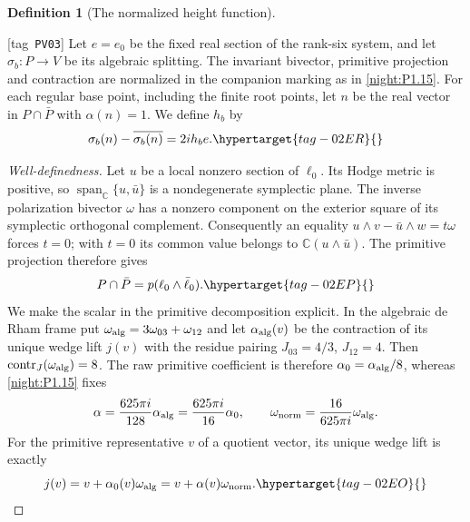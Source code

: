 \documentclass[11pt,a4paper]{article}
\numberwithin{equation}{section}
\theoremstyle{definition}
\newtheorem{definition}[definition]{Definition}
\newcommand{\StatementRecord}[4]{{\upshape\footnotesize[tag~\texttt{#3}]}\enspace\ignorespaces}
\begin{document}
\begin{definition}[The normalized height function]
\hypertarget{tag-PV03}{}\label{def:hb}
\StatementRecord{def:hb}{proved}{PV03}{}
Let $e=e_0$ be the fixed real section of the rank-six system,
and let $\sigma_b:P\to V$ be its algebraic splitting.
The invariant bivector, primitive projection and contraction are
normalized in the companion marking as in \cref{night:P1.15}.
For each regular base point, including the finite root points,
let $n$ be the real vector in $P\cap\bar P$ with $\alpha(n)=1$.
We define $h_b$ by
\begin{equation}
 \sigma_b(n)-\overline{\sigma_b(n)}=2i h_b e.
 \hypertarget{tag-02ER}{}\label{maps:eq:F.20}
\end{equation}
\end{definition}
\begin{proof}[Well-definedness]
Let $u$ be a local nonzero section of $\ell_0$.
Its Hodge metric is positive, so $\operatorname{span}_{\mathbb C}\{u,\bar u\}$
is a nondegenerate symplectic plane. The inverse polarization
bivector $\omega$ has a nonzero component on the exterior square
of its symplectic orthogonal complement. Consequently an equality
$u\wedge v-\bar u\wedge w=t\omega$ forces $t=0$; with $t=0$
its common value belongs to $\mathbb C(u\wedge\bar u)$.
The primitive projection therefore gives
\begin{equation}
 P\cap\bar P=p(\ell_0\wedge\bar\ell_0).
 \hypertarget{tag-02EP}{}\label{maps:eq:F.19}
\end{equation}
We make the scalar in the primitive decomposition explicit.
In the algebraic de Rham frame put
$\omega_{\rm alg}=3\omega_{03}+\omega_{12}$ and let
$\alpha_{\rm alg}(v)$ be the contraction of its unique wedge
lift $j(v)$ with the residue pairing $J_{03}=4/3$, $J_{12}=4$. Then
$\operatorname{contr}_{J}(\omega_{\rm alg})=8$. The raw primitive
coefficient is therefore $\alpha_0=\alpha_{\rm alg}/8$, whereas
\cref{night:P1.15} fixes
\[
 \alpha=\frac{625\pi i}{128}\alpha_{\rm alg}
        =\frac{625\pi i}{16}\alpha_0,
 \qquad
 \omega_{\rm norm}=\frac{16}{625\pi i}\omega_{\rm alg}.
\]
For the primitive representative $v$ of a quotient vector, its
unique wedge lift is exactly
\begin{equation}
 j(v)=v+\alpha_0(v)\omega_{\rm alg}
     =v+\alpha(v)\omega_{\rm norm}.
 \hypertarget{tag-02EO}{}\label{maps:eq:F.18}
\end{equation}


\end{proof}
\end{document}
